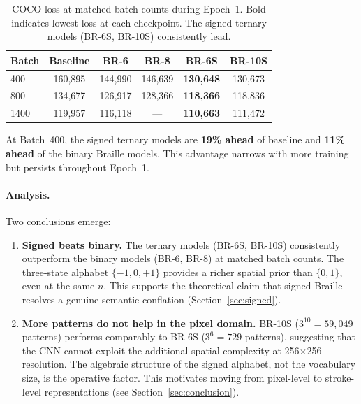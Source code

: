 \documentclass[11pt,a4paper]{article}
\begin{document}
\begin{table}[h]
  \centering
  \begin{tabular}{@{}lccccc@{}}
    \toprule
    Batch & Baseline & BR-6 & BR-8 & BR-6S & BR-10S \\
    \midrule
    400  & 160{,}895 & 144{,}990 & 146{,}639 & \textbf{130{,}648} & 130{,}673 \\
    800  & 134{,}677 & 126{,}917 & 128{,}366 & \textbf{118{,}366} & 118{,}836 \\
    1400 & 119{,}957 & 116{,}118 & ---       & \textbf{110{,}663} & 111{,}472 \\
    \bottomrule
  \end{tabular}
  \caption{COCO loss at matched batch counts during Epoch~1.
    Bold indicates lowest loss at each checkpoint.
    The signed ternary models (BR-6S, BR-10S) consistently lead.}
  \label{tab:headtohead}
\end{table}

At Batch~400, the signed ternary models are \textbf{19\% ahead} of baseline
and \textbf{11\% ahead} of the binary Braille models.
This advantage narrows with more training but persists throughout Epoch~1.

\paragraph{Analysis.}
Two conclusions emerge:

\begin{enumerate}
  \item \textbf{Signed beats binary.}
    The ternary models (BR-6S, BR-10S) consistently outperform
    the binary models (BR-6, BR-8) at matched batch counts.
    The three-state alphabet $\{-1,0,+1\}$ provides a richer
    spatial prior than $\{0,1\}$, even at the same $n$.
    This supports the theoretical claim that signed Braille resolves
    a genuine semantic conflation (Section~\ref{sec:signed}).

  \item \textbf{More patterns do not help in the pixel domain.}
    BR-10S ($3^{10} = 59{,}049$ patterns) performs comparably to
    BR-6S ($3^6 = 729$ patterns), suggesting that the CNN cannot
    exploit the additional spatial complexity at 256$\times$256 resolution.
    The algebraic structure of the signed alphabet, not the
    vocabulary size, is the operative factor.
    This motivates moving from pixel-level to
    stroke-level representations (see Section~\ref{sec:conclusion}).
\end{enumerate}
\end{document}
